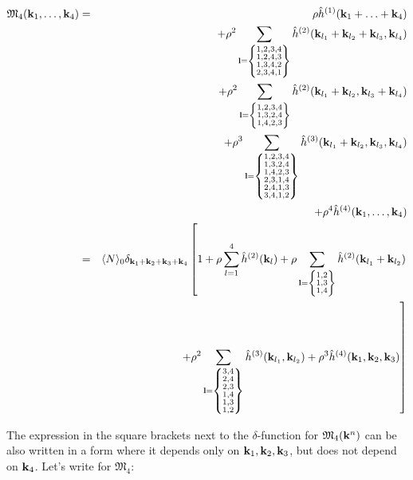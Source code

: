 \begin{eqnarray}
	\label{CumulantM4}
	\mathfrak M_4 (\vb k_1, \dotsc, \vb k_4) &=& \rho \hat{h}^{(1)}(\vb k_1 + \dotsc + \vb k_4) 
	\nonumber\\
	&& + \rho^2 \sum_{\vb l = \left\{ \substack{1,2,3,4 \\ 1,2,4,3 \\ 1,3,4,2 \\ 2,3,4,1} \right\}}
	\hat{h}^{(2)}(\vb k_{l_1} + \vb k_{l_2} + \vb k_{l_3}, \vb k_{l_4})
	\nonumber\\
	&& + \rho^2
	\sum_{\vb l = \left\{ \substack{1,2,3,4 \\ 1,3,2,4 \\ 1,4,2,3} \right\}}
	\hat{h}^{(2)}(\vb k_{l_1} + \vb k_{l_2}, \vb k_{l_3} + \vb k_{l_4})
	\nonumber\\
	&& + \rho^3
	\sum_{\vb l = \left\{\substack{1,2,3,4 \\ 1,3,2,4 \\ 1,4,2,3 \\ 2,3,1,4 \\ 2,4,1,3 \\ 3,4,1,2} \right\} }
	\hat{h}^{(3)}(\vb k_{l_1} + \vb k_{l_2}, \vb k_{l_3}, \vb k_{l_4})
	\nonumber\\
	&& +\rho^4 \hat{h}^{(4)}(\vb k_1, \dotsc, \vb k_4)
	\nonumber \\
	&=& \langle N \rangle_0 \delta_{\vb k_1 + \vb k_2 + \vb k_3 + \vb k_4} 
	\left[ 1 + \rho\sum_{l = 1}^4 \hat{h}^{(2)}(\vb k_l) + 
	\rho 
	\sum_{\vb l = \left\{\substack{1,2 \\ 1,3 \\ 1,4}\right\}}
	\hat{h}^{(2)} (\vb k_{l_1} + \vb k_{l_2})
	\right. \nonumber \\
	&& \left. + \rho^2
	\sum_{\vb l = \left\{\substack{3,4 \\ 2,4 \\ 2,3 \\ 1,4 \\ 1,3 \\ 1,2}\right\} }
	\hat{h}^{(3)}(\vb k_{l_1}, \vb k_{l_2})
	+ \rho^3 \hat{h}^{(4)} (\vb k_1, \vb k_2, \vb k_3)
	\right] 
\end{eqnarray}

The expression in the square brackets next to the $\delta$-function for $\mathfrak M_4(\vb k^n)$ can be also written in a form where it depends only on $\vb k_1, \vb k_2, \vb k_3$, but does not depend on $\vb k_4$.
Let's write for $\mathfrak M_4$:

